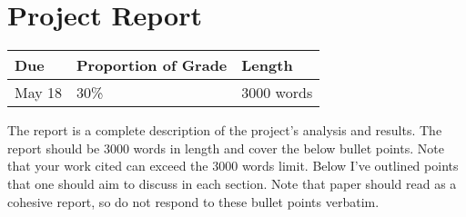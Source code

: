 \documentclass[
  12pt,
]{article}
\begin{document}
\hypertarget{project-report}{%
\section{Project Report}\label{project-report}}

\begin{longtable}[]{@{}lll@{}}
\toprule
\textbf{Due} & \textbf{Proportion of Grade} &
\textbf{Length}\tabularnewline
\midrule
\endhead
May 18 & 30\% & 3000 words\tabularnewline
\bottomrule
\end{longtable}

The report is a complete description of the project's analysis and
results. The report should be 3000 words in length and cover the below
bullet points. Note that your work cited can exceed the 3000 words
limit. Below I've outlined points that one should aim to discuss in each
section. Note that paper should read as a cohesive report, so do not
respond to these bullet points verbatim.
\end{document}
